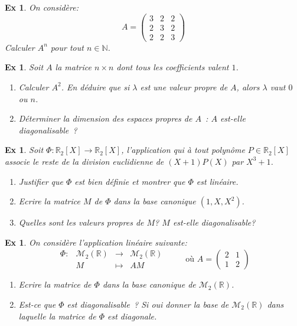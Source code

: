 \documentclass[a4paper,11pt]{article}
\theoremstyle{plain}
\newtheorem{ex}[thm]{Ex}{\theorembodyfont{\upshape}}
\newcommand{\R}{\mathbb{R}}
\newcommand{\N}{\mathbb{N}}
\newcommand{\M}{\mathcal{M}}
\begin{document}
\begin{ex}
On consid\`ere:
$$A=\left(
\begin{array}{ccc}
3&2&2\\
 2&3&2 \\
 2&2  &3
\end{array}
\right)$$
Calculer $A^n$ pour tout $n\in \N$.

\end{ex}

\newpage
\begin{ex}

Soit $A$ la matrice $n\times n$ dont tous les coefficients valent
$1$. 
\begin{enumerate}
\item Calculer $A^2$. En d\'eduire que si $\lambda $ est une valeur propre de
$A$, alors $\lambda $ vaut $0$ ou $n$. 
\item D\'eterminer la dimension des espaces
propres de $A$~: $A$ est-elle diagonalisable~?
\end{enumerate}

\end{ex}


\begin{ex}
Soit $\Phi :\R_2[X]\rightarrow \R_2[X]$, l'application qui \`a tout polyn\^ome $P\in \R_2[X]$ associe le reste de la division 
euclidienne de $(X+1)P(X)$ par $X^3+1$.
\begin{enumerate}
\item Justifier que $\Phi $ est bien d\'efinie et montrer que $\Phi $ est lin\'eaire.
\item Ecrire la matrice $M$ de $\Phi $ dans la base canonique $(1,X,X^2)$.
\item Quelles sont les valeurs propres de $M$? $M$ est-elle diagonalisable?
\end{enumerate}
\end{ex}





\begin{ex}
On consid\`ere l'application lin\'eaire suivante:
 $$\begin{array}{cccl}\Phi:&\M_2(\R)&\longrightarrow&\M_2(\R)\\
&M&\longmapsto&AM\end{array}\hspace{1cm}\text{o\`u }A=\left(\begin{array}{cc}2&1\\1&2\end{array}\right)$$

\begin{enumerate}
\item Ecrire la matrice de $\Phi$ dans la base canonique de $\M_2(\R)$.

\item Est-ce que $\Phi$ est diagonalisable~? Si oui donner la base de $\M_2(\R)$ dans laquelle la matrice de $\Phi$ est diagonale. 
\end{enumerate}
\end{ex}
\end{document}
